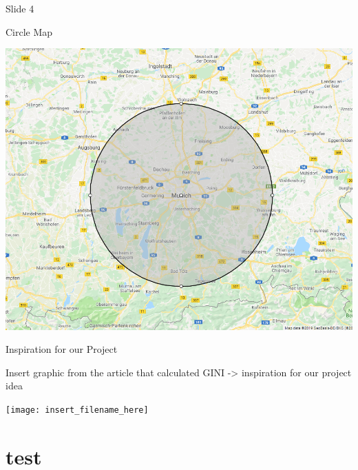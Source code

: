\documentclass[11pt,ignorenonframetext,]{beamer}
\begin{document}
\begin{frame}{Slide 4}

\begin{block}{Circle Map}

\begin{center}\includegraphics[width=0.8\linewidth,height=0.8\textheight]{map_circle} \end{center}

\end{block}

\end{frame}

\begin{frame}{Inspiration for our Project}

Insert graphic from the article that calculated GINI -\textgreater{}
inspiration for our project idea

\begin{center}\texttt{[image: insert\_filename\_here]} \end{center}

\end{frame}

\section{test}\label{test}
\end{document}
